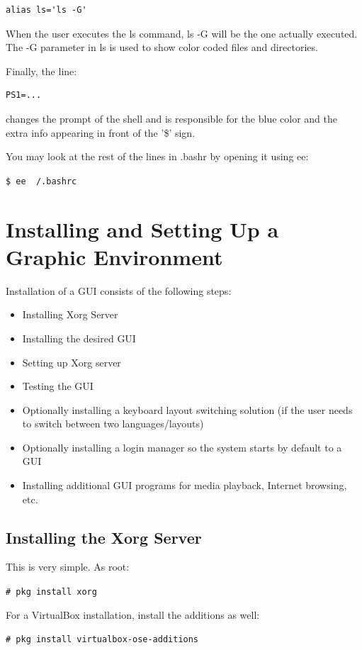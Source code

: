 \documentclass[a4paper,twoside,12pt]{article}
\newcommand{\coderoot}[1]{\texttt{\# #1}}
\newcommand{\codeuser}[1]{\texttt{\$ #1}}
\begin{document}
\begin{verbatim}
alias ls='ls -G'
\end{verbatim}

When the user executes the ls command, ls -G will be the one actually executed. The -G parameter in ls is used to show color coded files and directories.

Finally, the line:

\begin{verbatim}
PS1=...
\end{verbatim}

changes the prompt of the shell and is responsible for the blue color and the extra info appearing in front of the '\$' sign.

You may look at the rest of the lines in .bashr by opening it using ee:

\codeuser{ee ~/.bashrc}

\section{Installing and Setting Up a Graphic Environment}

Installation of a GUI consists of the following steps:

\begin{itemize}
\item Installing Xorg Server
\item Installing the desired GUI
\item Setting up Xorg server
\item Testing the GUI
\item Optionally installing a keyboard layout switching solution (if the user needs to switch between two languages/layouts)
\item Optionally installing a login manager so the system starts by default to a GUI
\item Installing additional GUI programs for media playback, Internet browsing, etc.
\end{itemize}

\subsection{Installing the Xorg Server}
This is very simple. As root:

\coderoot{pkg install xorg}

For a VirtualBox installation, install the additions as well:

\coderoot{pkg install virtualbox-ose-additions}
\end{document}
